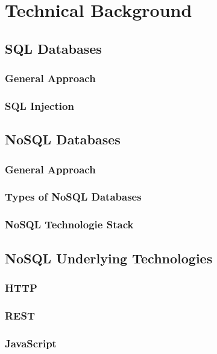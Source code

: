 \chapter{Technical Background}
\label{cha:technicalBackground}

\section{SQL Databases}
\subsection{General Approach}
\subsection{SQL Injection}

\section{NoSQL Databases}
\subsection{General Approach}
\subsection{Types of NoSQL Databases}
\subsection{NoSQL Technologie Stack}

\section{NoSQL Underlying Technologies}
\subsection{HTTP}
\subsection{REST}
\subsection{JavaScript}


